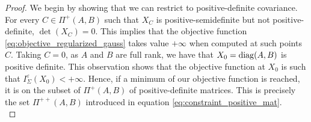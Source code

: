\documentclass[]{article}
\def\diag{\mathop{\rm diag}\nolimits}
\numberwithin{equation}{section}
\theoremstyle{plain}
\begin{document}
\begin{proof}
We begin by showing that we can restrict to positive-definite covariance. For every $C \in \Pi^{+}(A,B)$ such that $X_C$ is positive-semidefinite but not positive-definite, $\det(X_C) = 0$. This implies that the objective function \eqref{eq:objective_regularized_gauss} takes value $+\infty$ when computed at such points $C$. Taking $C = 0$, as $A$ and $B$ are full rank, we have that $X_0 = \diag(A,B)$ is positive definite. This observation shows that the objective function at $X_0$ is such that $I_\Sigma^{\varepsilon}(X_0) < +\infty$. Hence, if a minimum of our objective function is reached, it is on the subset of $\Pi^+(A,B)$ of positive-definite matrices. This is precisely the set $\Pi^{++}(A,B)$ introduced in equation \eqref{eq:constraint_positive_mat}.\\
	

\end{proof}
\end{document}
